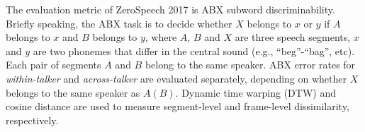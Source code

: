 \documentclass[a4paper]{article}
\newcommand{\quotes}[1]{``#1''}
\begin{document}
The evaluation metric of ZeroSpeech 2017 is ABX subword discriminability. Briefly speaking, the ABX task is to decide whether $X$ belongs to $x$ or $y$ if $A$ belongs to $x$ and $B$ belongs to $y$, where $A$, $B$ and $X$ are three speech segments, $x$ and $y$ are two phonemes that differ in the central sound (e.g., \quotes{beg}-\quotes{bag}, etc). 
Each pair of segments $A$ and $B$ belong to the same speaker. 
ABX error rates for \textit{within-talker} and \textit{across-talker} are evaluated separately, depending on whether $X$ belongs to the same speaker as $A(B)$.
Dynamic time warping (DTW) and cosine distance are used to measure segment-level and frame-level dissimilarity, respectively.
\end{document}
